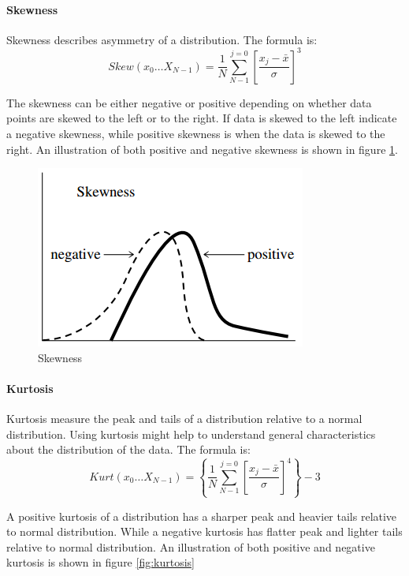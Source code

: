\documentclass[USenglish]{ifimaster}  %
\begin{document}
	\paragraph{Skewness} 
	Skewness describes asymmetry of a distribution. The formula is\cite{Press:2007:NRE:1403886}:
	\begin{equation}
	Skew(x_0\dotsc X_{N-1})  =  \frac{1}{N}\sum_{N-1}^{j=0}\left [ \frac{x_j-\bar{x}}{\sigma} \right ]^3
	\label{eq:skew}
	\end{equation}
	
	The skewness can be either negative or positive depending on whether data points are skewed to the left or to the right. If data is skewed to the left indicate a negative skewness, while positive skewness is when the data is skewed to the right. An illustration of both positive and negative skewness is shown in figure \ref{fig:skew}.
	
	\begin{figure}[h]
		\centering
		\includegraphics[scale=0.8]{Figures/Skewness}
		\caption{Skewness}
		\label{fig:skew}
	\end{figure}
	
	\FloatBarrier
	
	\paragraph{Kurtosis}
	Kurtosis measure the peak and tails of a distribution relative to a normal distribution. Using kurtosis might help to understand general characteristics about the distribution of the data. The formula is\cite{Press:2007:NRE:1403886}:
	\begin{equation}
	Kurt(x_0\dotsc X_{N-1}) = \left \{ \frac{1}{N}\sum_{N-1}^{j=0}\left [ \frac{x_j-\bar{x}}{\sigma} \right ]^4 \right \}-3
	\label{eq:kurtosis}
	\end{equation}
	
	A positive kurtosis of a distribution has a sharper peak and heavier tails relative to normal distribution. While a negative kurtosis has flatter peak and lighter tails relative to normal distribution. An illustration of both positive and negative kurtosis is shown in figure \ref{fig:kurtosis}
	
\end{document}
